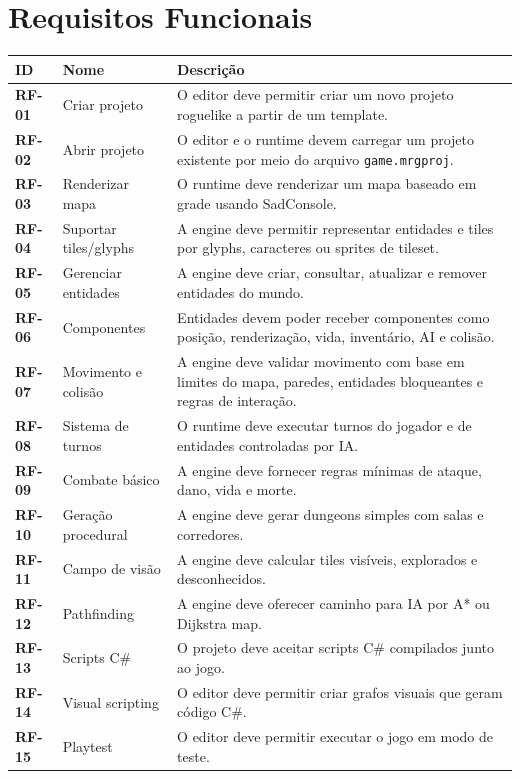 \documentclass[12pt,a4paper]{article}
\newcommand{\req}[1]{\textbf{#1}}
\begin{document}
\section{Requisitos Funcionais}

\begin{longtable}{p{2.1cm}p{4.1cm}p{7.8cm}}
\toprule
\textbf{ID} & \textbf{Nome} & \textbf{Descrição} \\
\midrule
\req{RF-01} & Criar projeto & O editor deve permitir criar um novo projeto roguelike a partir de um template. \\
\req{RF-02} & Abrir projeto & O editor e o runtime devem carregar um projeto existente por meio do arquivo \texttt{game.mrgproj}. \\
\req{RF-03} & Renderizar mapa & O runtime deve renderizar um mapa baseado em grade usando SadConsole. \\
\req{RF-04} & Suportar tiles/glyphs & A engine deve permitir representar entidades e tiles por glyphs, caracteres ou sprites de tileset. \\
\req{RF-05} & Gerenciar entidades & A engine deve criar, consultar, atualizar e remover entidades do mundo. \\
\req{RF-06} & Componentes & Entidades devem poder receber componentes como posição, renderização, vida, inventário, AI e colisão. \\
\req{RF-07} & Movimento e colisão & A engine deve validar movimento com base em limites do mapa, paredes, entidades bloqueantes e regras de interação. \\
\req{RF-08} & Sistema de turnos & O runtime deve executar turnos do jogador e de entidades controladas por IA. \\
\req{RF-09} & Combate básico & A engine deve fornecer regras mínimas de ataque, dano, vida e morte. \\
\req{RF-10} & Geração procedural & A engine deve gerar dungeons simples com salas e corredores. \\
\req{RF-11} & Campo de visão & A engine deve calcular tiles visíveis, explorados e desconhecidos. \\
\req{RF-12} & Pathfinding & A engine deve oferecer caminho para IA por A* ou Dijkstra map. \\
\req{RF-13} & Scripts C\# & O projeto deve aceitar scripts C\# compilados junto ao jogo. \\
\req{RF-14} & Visual scripting & O editor deve permitir criar grafos visuais que geram código C\#. \\
\req{RF-15} & Playtest & O editor deve permitir executar o jogo em modo de teste. \\

\end{longtable}
\end{document}
